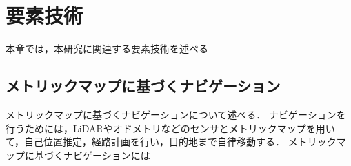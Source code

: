 \chapter{要素技術}
\label{chap:elemental}
本章では，本研究に関連する要素技術を述べる
\section{メトリックマップに基づくナビゲーション}
メトリックマップに基づくナビゲーションについて述べる．
ナビゲーションを行うためには，LiDARやオドメトリなどのセンサとメトリックマップを用いて，自己位置推定，経路計画を行い，目的地まで自律移動する．
メトリックマップに基づくナビゲーションには